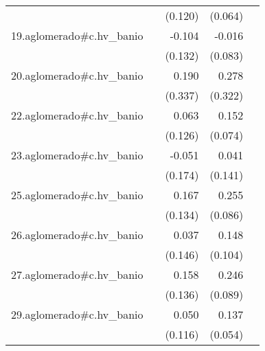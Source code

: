 {\begin{longtable}{l*{4}{D{.}{.}{-1}}}
            &                     &     (0.120)         &     (0.064)         &                     \\
\addlinespace
19.aglomerado#c.hv\_banio&                     &      -0.104         &      -0.016         &                     \\
            &                     &     (0.132)         &     (0.083)         &                     \\
\addlinespace
20.aglomerado#c.hv\_banio&                     &       0.190         &       0.278         &                     \\
            &                     &     (0.337)         &     (0.322)         &                     \\
\addlinespace
22.aglomerado#c.hv\_banio&                     &       0.063         &       0.152\sym{*}  &                     \\
            &                     &     (0.126)         &     (0.074)         &                     \\
\addlinespace
23.aglomerado#c.hv\_banio&                     &      -0.051         &       0.041         &                     \\
            &                     &     (0.174)         &     (0.141)         &                     \\
\addlinespace
25.aglomerado#c.hv\_banio&                     &       0.167         &       0.255\sym{**} &                     \\
            &                     &     (0.134)         &     (0.086)         &                     \\
\addlinespace
26.aglomerado#c.hv\_banio&                     &       0.037         &       0.148         &                     \\
            &                     &     (0.146)         &     (0.104)         &                     \\
\addlinespace
27.aglomerado#c.hv\_banio&                     &       0.158         &       0.246\sym{**} &                     \\
            &                     &     (0.136)         &     (0.089)         &                     \\
\addlinespace
29.aglomerado#c.hv\_banio&                     &       0.050         &       0.137\sym{*}  &                     \\
            &                     &     (0.116)         &     (0.054)         &                     \\

\end{longtable}}
